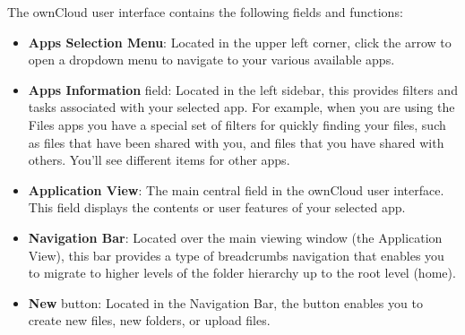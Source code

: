 \documentclass[letterpaper,10pt,english]{sphinxmanual}
\begin{document}
The ownCloud user interface contains the following fields and functions:
\begin{itemize}
\item {} 
\textbf{Apps Selection Menu}: Located in the upper left corner, click the arrow to
open a dropdown menu to navigate to your various available apps.

\item {} 
\textbf{Apps Information} field: Located in the left sidebar, this provides
filters and tasks associated with your selected app.  For example, when you
are using the Files apps you have a special set of filters for quickly
finding your files, such as files that have been shared with you, and files
that you have shared with others. You'll see different items for other apps.

\item {} 
\textbf{Application View}: The main central field in the ownCloud user interface.
This field displays the contents or user features of your selected app.

\item {} 
\textbf{Navigation Bar}: Located over the main viewing window (the Application
View), this bar provides a type of breadcrumbs navigation that enables you to
migrate to higher levels of the folder hierarchy up to the root level (home).

\item {} 
\textbf{New} button: Located in the Navigation Bar, the  button
enables you to create new files, new folders, or upload files.

\end{itemize}
\end{document}
